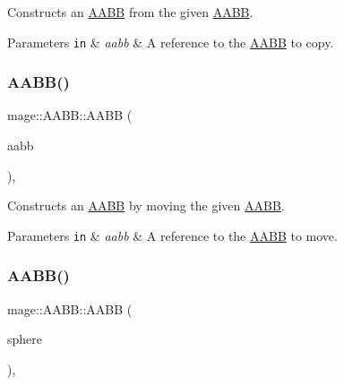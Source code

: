 Constructs an \mbox{\hyperlink{classmage_1_1_a_a_b_b}{A\+A\+BB}} from the given \mbox{\hyperlink{classmage_1_1_a_a_b_b}{A\+A\+BB}}.


\begin{DoxyParams}[1]{Parameters}
\mbox{\tt in}  & {\em aabb} & A reference to the \mbox{\hyperlink{classmage_1_1_a_a_b_b}{A\+A\+BB}} to copy. \\
\hline
\end{DoxyParams}
\mbox{\label{classmage_1_1_a_a_b_b_ad679d44369d5300de286e1fef947df1f}} 
\subsubsection{\texorpdfstring{A\+A\+B\+B()}{AABB()}\hspace{0.1cm}{\footnotesize\ttfamily [7/8]}}
{\footnotesize\ttfamily mage\+::\+A\+A\+B\+B\+::\+A\+A\+BB (\begin{DoxyParamCaption}\item[{\mbox{\hyperlink{classmage_1_1_a_a_b_b}{A\+A\+BB}} \&\&}]{aabb }\end{DoxyParamCaption})\hspace{0.3cm}{\ttfamily [default]}, {\ttfamily [noexcept]}}

Constructs an \mbox{\hyperlink{classmage_1_1_a_a_b_b}{A\+A\+BB}} by moving the given \mbox{\hyperlink{classmage_1_1_a_a_b_b}{A\+A\+BB}}.


\begin{DoxyParams}[1]{Parameters}
\mbox{\tt in}  & {\em aabb} & A reference to the \mbox{\hyperlink{classmage_1_1_a_a_b_b}{A\+A\+BB}} to move. \\
\hline
\end{DoxyParams}
\mbox{\label{classmage_1_1_a_a_b_b_a16194c87d55c8461402682c3ff5db730}} 
\subsubsection{\texorpdfstring{A\+A\+B\+B()}{AABB()}\hspace{0.1cm}{\footnotesize\ttfamily [8/8]}}
{\footnotesize\ttfamily mage\+::\+A\+A\+B\+B\+::\+A\+A\+BB (\begin{DoxyParamCaption}\item[{const \mbox{\hyperlink{classmage_1_1_bounding_sphere}{Bounding\+Sphere}} \&}]{sphere }\end{DoxyParamCaption})\hspace{0.3cm}{\ttfamily [explicit]}, {\ttfamily [noexcept]}}

